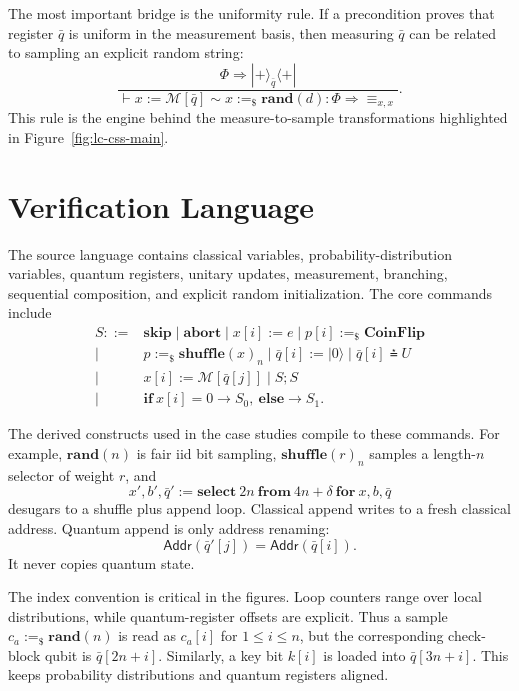 The most important bridge is the uniformity rule. If a precondition proves that register $\bar q$ is uniform in the measurement basis, then measuring $\bar q$ can be related to sampling an explicit random string:
\[
\frac{\Phi\Longrightarrow |+\rangle_{\bar q}\langle +|}
{\vdash x:=\mathcal M[\bar q]\sim x:=_\$\mathbf{rand}(d):\Phi
\Longrightarrow\equiv_{x,x}}.
\]
This rule is the engine behind the measure-to-sample transformations highlighted in Figure~\ref{fig:lc-css-main}.

\section{Verification Language}
\label{sec:syntax}

The source language contains classical variables, probability-distribution variables, quantum registers, unitary updates, measurement, branching, sequential composition, and explicit random initialization. The core commands include
\[
\begin{aligned}
S ::= {}& \mathbf{skip}\mid \mathbf{abort}\mid x[i]:=e
        \mid p[i]:=_\$ \mathbf{CoinFlip}\\
\mid{}& p:=_\$\mathbf{shuffle}(x)_n
        \mid \bar q[i]:=|0\rangle
        \mid \bar q[i]\asteq U\\
\mid{}& x[i]:=\mathcal M[\bar q[j]]
        \mid S;S\\
\mid{}& \mathbf{if}\ x[i]=0\rightarrow S_0,\ 
        \mathbf{else}\rightarrow S_1 .
\end{aligned}
\]

The derived constructs used in the case studies compile to these commands. For example, $\mathbf{rand}(n)$ is fair iid bit sampling, $\mathbf{shuffle}(r)_n$ samples a length-$n$ selector of weight $r$, and
\[
x',b',\bar q' := \mathbf{select}\ 2n\ \mathbf{from}\ 4n+\delta\ \mathbf{for}\ x,b,\bar q
\]
desugars to a shuffle plus append loop. Classical append writes to a fresh classical address. Quantum append is only address renaming:
\[
\mathsf{Addr}(\bar q'[j])=\mathsf{Addr}(\bar q[i]).
\]
It never copies quantum state.

The index convention is critical in the figures. Loop counters range over local distributions, while quantum-register offsets are explicit. Thus a sample $c_a:=_\$\mathbf{rand}(n)$ is read as $c_a[i]$ for $1\le i\le n$, but the corresponding check-block qubit is $\bar q[2n+i]$. Similarly, a key bit $k[i]$ is loaded into $\bar q[3n+i]$. This keeps probability distributions and quantum registers aligned.

